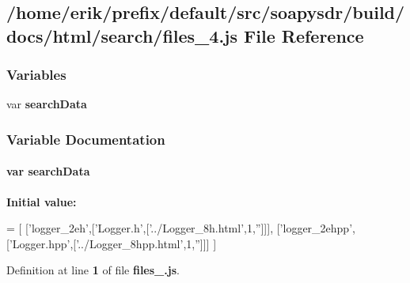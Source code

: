 \subsection{/home/erik/prefix/default/src/soapysdr/build/docs/html/search/files\+\_\+4.js File Reference}
\label{files__4_8js}
\subsubsection*{Variables}
\begin{DoxyCompactItemize}
\item 
var {\bf search\+Data}
\end{DoxyCompactItemize}


\subsubsection{Variable Documentation}
\paragraph[{search\+Data}]{\setlength{\rightskip}{0pt plus 5cm}var search\+Data}\label{files__4_8js_ad01a7523f103d6242ef9b0451861231e}
{\bfseries Initial value\+:}
\begin{DoxyCode}
=
[
  [\textcolor{stringliteral}{'logger\_2eh'},[\textcolor{stringliteral}{'Logger.h'},[\textcolor{stringliteral}{'../Logger\_8h.html'},1,\textcolor{stringliteral}{''}]]],
  [\textcolor{stringliteral}{'logger\_2ehpp'},[\textcolor{stringliteral}{'Logger.hpp'},[\textcolor{stringliteral}{'../Logger\_8hpp.html'},1,\textcolor{stringliteral}{''}]]]
]
\end{DoxyCode}


Definition at line {\bf 1} of file {\bf files\+\_.\+js}.

